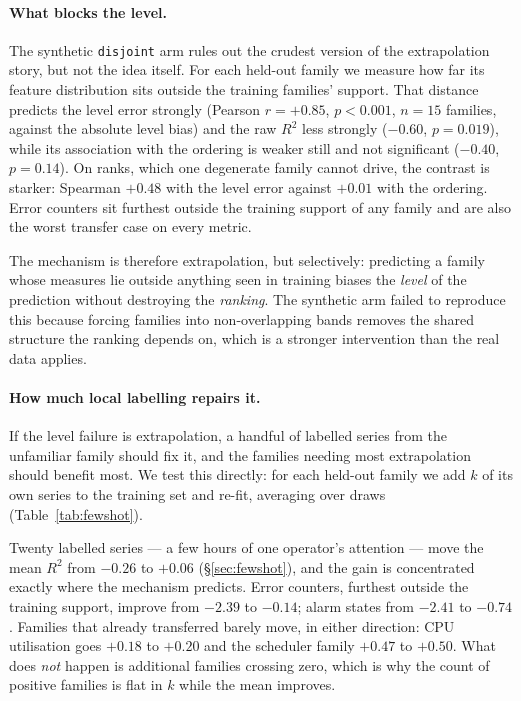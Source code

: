 \documentclass[11pt,a4paper]{article}
\begin{document}
\paragraph{What blocks the level.} The synthetic \texttt{disjoint} arm rules
out the crudest version of the extrapolation story, but not the idea itself. For
each held-out family we measure how far its feature distribution sits outside
the training families' support. That distance predicts the level error strongly
(Pearson \(r=+0.85\), \(p<0.001\), \(n=15\) families, against the absolute
level bias) and the raw \(R^2\) less strongly (\(-0.60\), \(p=0.019\)),
while its association with the ordering is weaker still and not significant
(\(-0.40\), \(p=0.14\)). On ranks, which one degenerate family cannot drive,
the contrast is starker: Spearman \(+0.48\) with the level error against
\(+0.01\) with the ordering. Error
counters sit furthest outside the training support of any family and are also
the worst transfer case on every metric.

The mechanism is therefore extrapolation, but selectively: predicting a family
whose measures lie outside anything seen in training biases the \emph{level} of
the prediction without destroying the \emph{ranking}. The synthetic arm failed
to reproduce this because forcing families into non-overlapping bands removes
the shared structure the ranking depends on, which is a stronger intervention
than the real data applies.

\paragraph{How much local labelling repairs it.} If the level failure is
extrapolation, a handful of labelled series from the unfamiliar family should
fix it, and the families needing most extrapolation should benefit most. We test
this directly: for each held-out family we add \(k\) of its own series to the
training set and re-fit, averaging over draws
(Table~\ref{tab:fewshot}).

Twenty labelled series --- a few hours of one operator's attention --- move
the mean \(R^2\) from \(-0.26\) to \(+0.06\) (\S\ref{sec:fewshot}), and the
gain is concentrated exactly where the mechanism predicts. Error counters,
furthest outside the training support, improve from \(-2.39\) to \(-0.14\);
alarm states from \(-2.41\) to \(-0.74\). Families that already transferred
barely move, in either direction: CPU utilisation goes \(+0.18\) to \(+0.20\)
and the scheduler family \(+0.47\) to \(+0.50\). What does \emph{not} happen is
additional families crossing zero, which is why the count of positive families
is flat in \(k\) while the mean improves.
\end{document}
